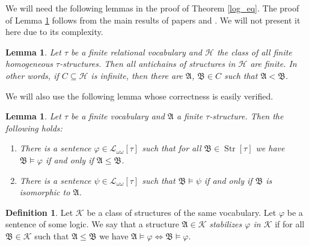 \documentclass{ndjflart}
\theoremstyle{plain}
\newtheorem{lemma}[conjecture]{Lemma}
\theoremstyle{definition}
\newtheorem{definition}[conjecture]{Definition}
\numberwithin{equation}{section}
\DeclareMathOperator{\Str}{Str}
\begin{document}
We will need the following lemmas in the proof of Theorem \ref{log_eq}.
The proof of Lemma \ref{shrinking} follows from the main results of papers \cite{Cherlin:1986} and \cite{Lachlan:1984}. We will not present it here due to its complexity.

\begin{lemma}\label{shrinking}
Let $\tau$ be a finite relational vocabulary and $\mathcal{H}$ the class of all finite homogeneous $\tau$-structures. Then all antichains of structures in $\mathcal{H}$ are finite. In other words, if $C \subseteq \mathcal{H}$ is infinite, then there are $\mathfrak{A}$, $\mathfrak{B} \in C$ such that $\mathfrak{A} < \mathfrak{B}$.
\end{lemma}

We will also use the following lemma whose correctness is easily verified.

\begin{lemma}\label{substr}
Let $\tau$ be a finite vocabulary and $\mathfrak{A}$ a finite $\tau$-structure.
Then the following holds:
\begin{enumerate}
\item There is a sentence $\varphi \in \mathcal{L}_{\omega\omega}[\tau]$ such that
for all $\mathfrak{B}\in \Str[\tau]$ we have
$\mathfrak{B} \vDash \varphi$ if and only if $\mathfrak{A} \leq \mathfrak{B}$.
\item There is a sentence $\psi \in \mathcal{L}_{\omega\omega}[\tau]$ such that
$\mathfrak{B} \vDash \psi$ if and only if $\mathfrak{B}$ is isomorphic to $\mathfrak{A}$.
\end{enumerate}
\end{lemma}

\begin{definition}
Let $\mathcal{K}$ be a class of structures of the same vocabulary.
Let $\varphi$ be a sentence of some logic.
We say that a structure $\mathfrak{A}\in\mathcal{K}$ \emph{stabilizes $\varphi$ in $\mathcal{K}$} if for all $\mathfrak{B} \in \mathcal{K}$ such that $\mathfrak{A}\leq\mathfrak{B}$ we have $\mathfrak{A} \vDash \varphi \Leftrightarrow \mathfrak{B} \vDash \varphi$.
\end{definition}
\end{document}
